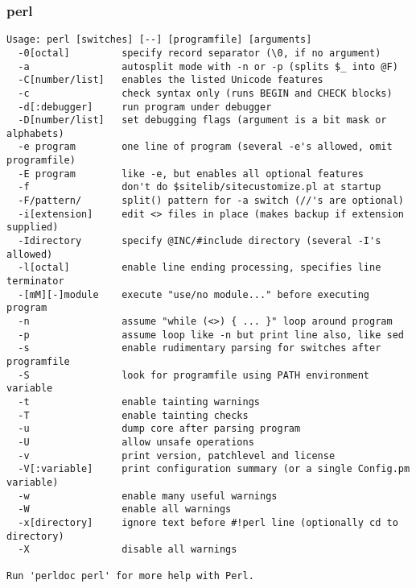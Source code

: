 \documentclass[11pt,a4paper]{article}
\newcommand{\cmd}[1]{
  \subsubsection*{#1}
  \addcontentsline{toc}{subsection}{#1}
}
\begin{document}
\cmd{perl}
\begin{verbatim}
Usage: perl [switches] [--] [programfile] [arguments]
  -0[octal]         specify record separator (\0, if no argument)
  -a                autosplit mode with -n or -p (splits $_ into @F)
  -C[number/list]   enables the listed Unicode features
  -c                check syntax only (runs BEGIN and CHECK blocks)
  -d[:debugger]     run program under debugger
  -D[number/list]   set debugging flags (argument is a bit mask or alphabets)
  -e program        one line of program (several -e's allowed, omit programfile)
  -E program        like -e, but enables all optional features
  -f                don't do $sitelib/sitecustomize.pl at startup
  -F/pattern/       split() pattern for -a switch (//'s are optional)
  -i[extension]     edit <> files in place (makes backup if extension supplied)
  -Idirectory       specify @INC/#include directory (several -I's allowed)
  -l[octal]         enable line ending processing, specifies line terminator
  -[mM][-]module    execute "use/no module..." before executing program
  -n                assume "while (<>) { ... }" loop around program
  -p                assume loop like -n but print line also, like sed
  -s                enable rudimentary parsing for switches after programfile
  -S                look for programfile using PATH environment variable
  -t                enable tainting warnings
  -T                enable tainting checks
  -u                dump core after parsing program
  -U                allow unsafe operations
  -v                print version, patchlevel and license
  -V[:variable]     print configuration summary (or a single Config.pm variable)
  -w                enable many useful warnings
  -W                enable all warnings
  -x[directory]     ignore text before #!perl line (optionally cd to directory)
  -X                disable all warnings
  
Run 'perldoc perl' for more help with Perl.

\end{verbatim}

\end{document}
